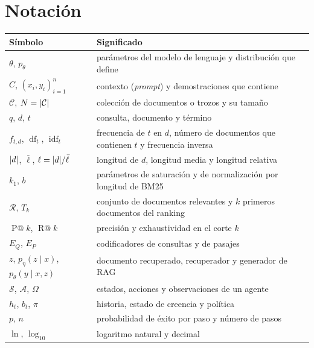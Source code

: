 \documentclass[11pt,a4paper,twoside,openany]{book}
\makeatletter
\newcommand{\idf}{\operatorname{idf}}
\newcommand{\df}{\operatorname{df}}
\newcommand{\Pk}[1]{\operatorname{P@}#1}
\newcommand{\Rk}[1]{\operatorname{R@}#1}
\newcommand{\Col}{\mathcal{C}}
\newcommand{\Rel}{\mathcal{R}}
\makeatother
\begin{document}
\section*{Notación}
\begin{center}\small
\begin{tabularx}{\textwidth}{@{}l>{\raggedright\arraybackslash}X@{}}
\toprule
Símbolo & Significado \\
\midrule
$\theta$, $p_\theta$ & parámetros del modelo de lenguaje y distribución que define \\
$C$, $(x_i,y_i)_{i=1}^{n}$ & contexto (\emph{prompt}) y demostraciones que contiene \\
$\Col$, $N=\abs{\Col}$ & colección de documentos o trozos y su tamaño \\
$q$, $d$, $t$ & consulta, documento y término \\
$f_{t,d}$, $\df_t$, $\idf_t$ & frecuencia de $t$ en $d$, número de documentos que contienen $t$ y frecuencia inversa \\
$\lvert d\rvert$, $\bar\ell$, $\ell=\lvert d\rvert/\bar\ell$ & longitud de $d$, longitud media y longitud relativa \\
$k_1$, $b$ & parámetros de saturación y de normalización por longitud de BM25 \\
$\Rel$, $T_k$ & conjunto de documentos relevantes y $k$ primeros documentos del ranking \\
$\Pk{k}$, $\Rk{k}$ & precisión y exhaustividad en el corte $k$ \\
$E_Q$, $E_P$ & codificadores de consultas y de pasajes \\
$z$, $p_\eta(z\mid x)$, $p_\theta(y\mid x,z)$ & documento recuperado, recuperador y generador de RAG \\
$\mathcal{S}$, $\mathcal{A}$, $\Omega$ & estados, acciones y observaciones de un agente \\
$h_t$, $b_t$, $\pi$ & historia, estado de creencia y política \\
$p$, $n$ & probabilidad de éxito por paso y número de pasos \\
$\ln$, $\log_{10}$ & logaritmo natural y decimal \\
\bottomrule
\end{tabularx}
\end{center}

\tableofcontents

\mainmatter







\appendix


\backmatter

\end{document}

